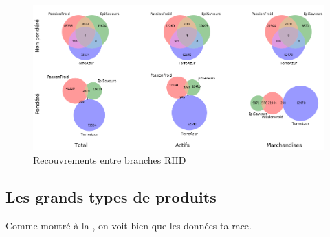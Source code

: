                 \begin{figure}[htbp]
                    \begin{center}
                    \includegraphics[width=\linewidth]{img/Diagrammes de Venn articles.png}
                    \end{center}
                    \caption{Recouvrements entre branches RHD}
                    \label{fig:venn_article}
                \end{figure}       

            \subsection{Les grands types de produits}

            Comme montré à la , on voit bien que les données ta race.

